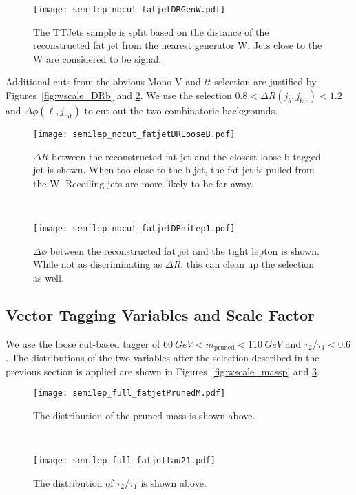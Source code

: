 \documentclass{article}
\begin{document}
\begin{figure}[h]
  \centering
  \texttt{[image: semilep\_nocut\_fatjetDRGenW.pdf]}
  \caption{The TTJets sample is split based on the distance of the reconstructed fat jet
  from the nearest generator W. Jets close to the W are considered to be signal.}
  \label{fig:wscale_DRGen}
\end{figure}

Additional cuts from the obvious Mono-V and $t\bar{t}$ selection are 
justified by Figures~\ref{fig:wscale_DRb} and \ref{fig:wscale_DPhiLep}.
We use the selection $0.8 < \Delta R(j_b,j_\text{fat}) < 1.2$ 
and $\Delta\phi(\ell,j_\text{fat})$ to cut out the two combinatoric backgrounds.

\begin{figure}[h]
  \centering
  \begin{minipage}{0.49\linewidth}
    \centering
    \texttt{[image: semilep\_nocut\_fatjetDRLooseB.pdf]}
    \caption{$\Delta R$ between the reconstructed fat jet and the closest loose
    b-tagged jet is shown. When too close to the b-jet, the fat jet is pulled from
    the W. Recoiling jets are more likely to be far away.}
    \label{fig:wscale_DRb}
  \end{minipage}
  ~
  \begin{minipage}{0.49\linewidth}
    \centering
    \texttt{[image: semilep\_nocut\_fatjetDPhiLep1.pdf]}
    \caption{$\Delta\phi$ between the reconstructed fat jet and the tight lepton
      is shown. While not as discriminating as $\Delta R$, this can clean up the selection
      as well.}
    \label{fig:wscale_DPhiLep}
  \end{minipage}
\end{figure}
  
\subsection{Vector Tagging Variables and Scale Factor} \label{sec:wscale_tagging}

We use the loose cut-based tagger of $\SI{60}{GeV} < m_\text{pruned} < \SI{110}{GeV}$
and $\tau_2/\tau_1 < 0.6$.
The distributions of the two variables after the selection described
in the previous section is applied are shown in
Figures~\ref{fig:wscale_massp} and \ref{fig:wscale_tau21}.

\begin{figure}[h]
  \centering
  \begin{minipage}{0.49\linewidth}
    \centering
    \texttt{[image: semilep\_full\_fatjetPrunedM.pdf]}
    \caption{The distribution of the pruned mass is shown above.}
    \label{fig:wscale_massp}
  \end{minipage}
  ~
  \begin{minipage}{0.49\linewidth}
    \centering
    \texttt{[image: semilep\_full\_fatjettau21.pdf]}
    \caption{The distribution of $\tau_2/\tau_1$ is shown above.}
    \label{fig:wscale_tau21}
  \end{minipage}
\end{figure}
  
\end{document}
